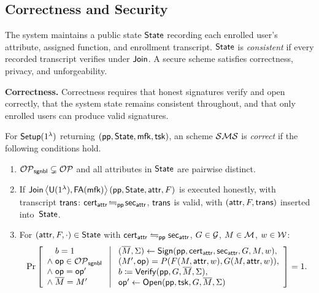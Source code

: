 \subsection{Correctness and Security}\label{subsection:sms-correctness-and-security}

The system maintains a public state $\mathsf{State}$ recording each enrolled user's
attribute, assigned function, and enrollment transcript.
$\mathsf{State}$ is \emph{consistent} if every recorded transcript verifies
under $\mathsf{Join}$.
A secure \SMS scheme satisfies correctness, privacy, and unforgeability.

\medskip
\noindent\textbf{Correctness.}
Correctness requires that honest signatures verify and open correctly,
that the system state remains consistent throughout,
and that only enrolled users can produce valid signatures.

\begin{definition}[Correctness]\label{definition:sms-correctness}
For $\mathsf{Setup}(1^\lambda)$ returning $(\mathsf{pp}, \mathsf{State}, \mathsf{mfk}, \mathsf{tsk})$,
an \SMS scheme $\mathcal{SMS}$ is \emph{correct} if the following conditions hold.
\begin{enumerate}
\item $\mathcal{OP}_\mathsf{sgnbl} \subsetneq \mathcal{OP}$
and all attributes in $\mathsf{State}$ are pairwise distinct.

\item If
$\mathsf{Join}\left\langle \mathsf{U}(1^\lambda),\mathsf{FA}(\mathsf{mfk})\right\rangle(\mathsf{pp}, \mathsf{State}, \mathsf{attr}, F)$
is executed honestly, with transcript $\mathsf{trans}$:
$\mathsf{cert}_{\mathsf{attr}} \!\leftrightharpoons_{\mathsf{pp}}\! \mathsf{sec}_{\mathsf{attr}}$,
$\mathsf{trans}$ is valid,
with $(\mathsf{attr}, F, \mathsf{trans})$ inserted into~$\mathsf{State}$.

\item For $(\mathsf{attr}, F, \cdot) \in \mathsf{State}$ with
$\mathsf{cert}_{\mathsf{attr}} \leftrightharpoons_{\mathsf{pp}} \mathsf{sec}_{\mathsf{attr}}$,
$G \in \mathcal{G}$, $M \in \mathcal{M}$, $w \in \mathcal{W}$:
\begin{equation}\label{equation:sms-correctness-probability}
\Pr\left[ \begin{array}{l} 
\phantom{\land}\; b = 1
\\
\land\; \mathsf{op} \in \mathcal{OP}_\mathsf{sgnbl}
\\
\land\; \mathsf{op} = \mathsf{op}' 
\\
\land\; \overline{M} = M'
 \end{array}\;\middle|\;\begin{array}{l} 
(\overline{M}, \Sigma) \gets \mathsf{Sign}(\mathsf{pp}, \mathsf{cert}_{\mathsf{attr}}, \mathsf{sec}_{\mathsf{attr}}, G, M, w),
\\
(M', \mathsf{op}) = P(F(M, \mathsf{attr}, w), G(M, \mathsf{attr}, w)),
\\
b \coloneqq \mathsf{Verify}(\mathsf{pp}, G, \overline{M}, \Sigma),
\\
\mathsf{op}' \gets \mathsf{Open}(\mathsf{pp}, \mathsf{tsk}, G, \overline{M}, \Sigma)
 \end{array} \right] = 1.
\end{equation}
\end{enumerate}
\end{definition}

